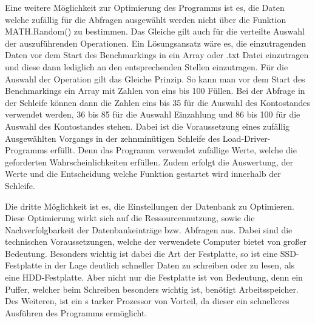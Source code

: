 Eine weitere Möglichkeit zur Optimierung des Programms ist es, die Daten welche
zufällig für die Abfragen ausgewählt werden nicht über die Funktion
MATH.Random() zu bestimmen. Das Gleiche gilt auch für die verteilte Auswahl der
auszuführenden Operationen. Ein Lösungsansatz wäre es, die einzutragenden Daten
vor dem Start des Benchmarkings in ein Array oder .txt Datei einzutragen und
diese dann lediglich an den entsprechenden Stellen einzutragen. Für die Auswahl
der Operation gilt das Gleiche Prinzip. So kann man vor dem Start des
Benchmarkings ein Array mit Zahlen von eins bis 100 Füllen. Bei der Abfrage in
der Schleife können dann die Zahlen eins bis 35 für die Auswahl des
Kontostandes verwendet werden, 36 bis 85 für die Auswahl Einzahlung und 86 bis
100 für die Auswahl des Kontostandes stehen. Dabei ist die Voraussetzung eines
zufällig Ausgewählten Vorgangs in der zehnminütigen Schleife des
Load-Driver-Programms erfüllt. Denn das Programm verwendet zufällige Werte,
welche die geforderten Wahrscheinlichkeiten erfüllen. Zudem erfolgt die
Auswertung, der Werte und die Entscheidung welche Funktion gestartet wird
innerhalb der Schleife.

Die dritte Möglichkeit ist es, die Einstellungen der Datenbank zu Optimieren.
Diese Optimierung wirkt sich auf die Ressourcennutzung, sowie die
Nachverfolgbarkeit der Datenbankeinträge bzw. Abfragen aus. Dabei sind die
technischen Voraussetzungen, welche der verwendete Computer bietet von großer
Bedeutung. Besonders wichtig ist dabei die Art der Festplatte, so ist eine
SSD-Festplatte in der Lage deutlich schneller Daten zu schreiben oder zu lesen,
als eine HDD-Festplatte. Aber nicht nur die Festplatte ist von Bedeutung, denn
ein Puffer, welcher beim Schreiben besonders wichtig ist, benötigt
Arbeitsspeicher. Des Weiteren, ist ein s tarker Prozessor von Vorteil, da dieser
ein schnelleres Ausführen des Programms ermöglicht.

\clearpage